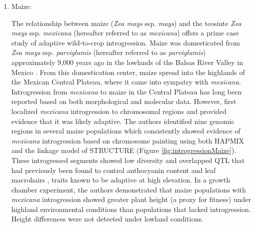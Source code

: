 \documentclass[11pt]{article}
\begin{document}
\begin{enumerate}
\item{Maize:}






The relationship between maize (\emph{Zea mays} ssp. \emph{mays}) and the teosinte \emph{Zea mays} ssp. \emph{mexicana} (hereafter referred to as \emph{mexicana}) offers a prime case study of adaptive wild-to-crop introgression.
Maize was domesticated from \emph{Zea mays} ssp. \emph{parviglumis} (hereafter referred to as \emph{parviglumis})  approximately 9,000 years ago in the lowlands of the Balsas River Valley in Mexico \cite{matsuoka2002single}.
From this domestication center, maize spread into the highlands of the Mexican Central Plateau, where it came into sympatry with \emph{mexicana}.
Introgression from \emph{mexicana} to maize in the Central Plateau has long been reported based on both morphological \cite {wilkes1977, lauter2004, doebley1984} and molecular \cite{matsuoka2002, vanHeerwaarden2011, doebley1987, warburton2011, fukunaga2005} data.
However, \citep{hufford2013} first localized \emph{mexicana} introgression to chromosomal regions and provided evidence that it was likely adaptive.
The authors identified nine genomic regions in several maize populations which consistently showed evidence of \emph{mexicana} introgression based on chromosome painting using both HAPMIX and the linkage model of STRUCTURE (Figure \ref{fig:introgressionMaize}).
These introgressed segments showed low diversity and overlapped QTL that had previously been found to control anthocyanin content and leaf macrohairs \cite{lauter2004}, traits known to be adaptive at high elevation.
In a growth chamber experiment, the authors demonstrated that maize populations with \emph{mexicana} introgression showed greater plant height (a proxy for fitness) under highland environmental conditions than populations that lacked introgression.
Height differences were not detected under lowland conditions.



\end{enumerate}
\end{document}
